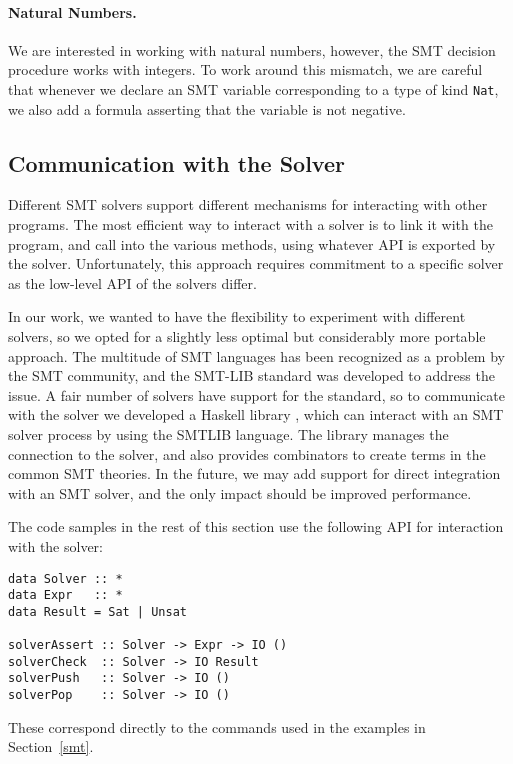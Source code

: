 \documentclass{sigplanconf}
\begin{document}
\paragraph{Natural Numbers.}
We are interested in working with natural numbers, however, the SMT
decision procedure works with integers.  To work around this mismatch,
we are careful that whenever we declare an SMT variable corresponding
to a type of kind \Verb"Nat", we also add a formula asserting that
the variable is not negative.



\subsection{Communication with the Solver}

Different SMT solvers support different mechanisms for interacting
with other programs.  The most efficient way to interact with a solver
is to link it with the program, and call into the various methods,
using whatever API is exported by the solver.  Unfortunately, this
approach requires commitment to a specific solver as the low-level
API of the solvers differ.

In our work, we wanted to have the flexibility to experiment with
different solvers, so we opted for a slightly less optimal but
considerably more portable approach.  The multitude of SMT languages
has been recognized as a problem by the SMT community, and the
SMT-LIB standard \cite{smtlib2} was developed to address the issue.
A fair number of solvers have support for the standard, so
to communicate with the solver we developed a Haskell library
\cite{simple-smt}, which can interact with an SMT solver process
by using the SMTLIB language.  The library manages the connection
to the solver, and also provides combinators to create terms
in the common SMT theories.  In the future, we may add support for
direct integration with an SMT solver, and the only impact
should be improved performance.

The code samples in the rest of this section use the following
API for interaction with the solver:
\begin{Verbatim}
data Solver :: *
data Expr   :: *
data Result = Sat | Unsat

solverAssert :: Solver -> Expr -> IO ()
solverCheck  :: Solver -> IO Result
solverPush   :: Solver -> IO ()
solverPop    :: Solver -> IO ()
\end{Verbatim}
These correspond directly to the commands used in the examples in
Section~\ref{smt}.
\end{document}
